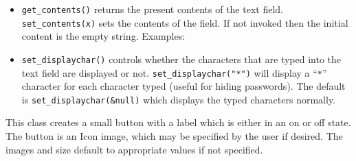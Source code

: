\begin{itemize}
\item\noindent\texttt{get\_contents()} returns the present contents of the text field.
\texttt{set\_contents(x)} sets the contents of the field. If not invoked then
the initial content is the empty string. Examples:


\item\noindent\texttt{set\_displaychar()} controls whether the characters that are typed
into the text field are displayed or not. \texttt{set\_displaychar("*")}
will display a ``\texttt{*}'' character for each character typed (useful
for hiding passwords). The default is \texttt{set\_displaychar(\&null)}
which displays the typed characters normally.
\end{itemize}

\medskip{}

This class creates a small button with a label which is either
in an on or off state. The button is an  Icon image, which may be
specified by the user if desired. The images and size default to
appropriate values if not specified.


